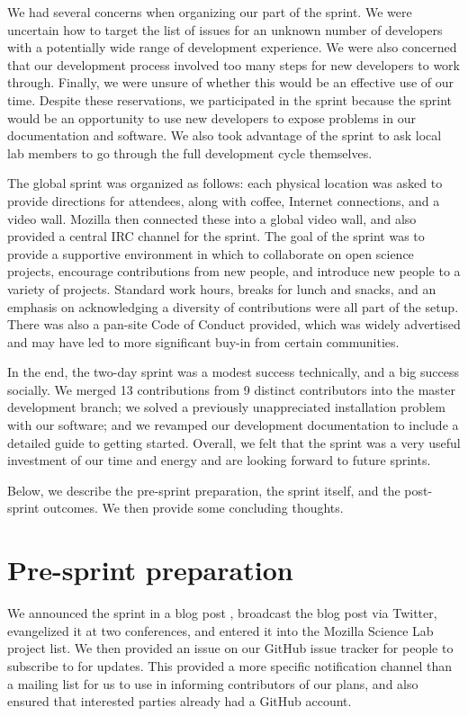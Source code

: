 \documentclass[11pt]{article}
\begin{document}
We had several concerns when organizing our part of the sprint.  We
were uncertain how to target the list of issues for an unknown number
of developers with a potentially wide range of development experience.
We were also concerned that our development process involved too many
steps for new developers to work through.  Finally, we were unsure of
whether this would be an effective use of our time.  Despite these
reservations, we participated in the sprint because the sprint would
be an opportunity to use new developers to expose problems in our
documentation and software.  We also took advantage of the sprint to
ask local lab members to go through the full development cycle
themselves.

The global sprint was organized as follows: each physical location was
asked to provide directions for attendees, along with coffee, Internet
connections, and a video wall.  Mozilla then connected these into a
global video wall, and also provided a central IRC channel for the
sprint.  The goal of the sprint was to provide a supportive
environment in which to collaborate on open science projects,
encourage contributions from new people, and introduce new people to a
variety of projects.  Standard work hours, breaks for lunch and
snacks, and an emphasis on acknowledging a diversity of contributions
were all part of the setup.  There was also a pan-site Code of Conduct
provided, which was widely advertised and may have led to more
significant buy-in from certain communities.

In the end, the two-day sprint was a modest success technically, and a
big success socially. We merged 13 contributions from 9 distinct
contributors into the master development branch; we solved a
previously unappreciated installation problem with our software; and
we revamped our development documentation to include a detailed guide
to getting started.  Overall, we felt that the sprint was a very
useful investment of our time and energy and are looking forward to
future sprints.

Below, we describe the pre-sprint preparation, the sprint itself, and the
post-sprint outcomes.  We then provide some concluding thoughts.

\section{Pre-sprint preparation}

We announced the sprint in a blog post \cite{blogpost}, broadcast the
blog post via Twitter, evangelized it at two conferences, and entered
it into the Mozilla Science Lab project list.  We then provided an
issue on our GitHub issue tracker for people to subscribe to for
updates.  This provided a more specific notification channel than a
mailing list for us to use in informing contributors of our plans, and
also ensured that interested parties already had a GitHub account.
\end{document}
